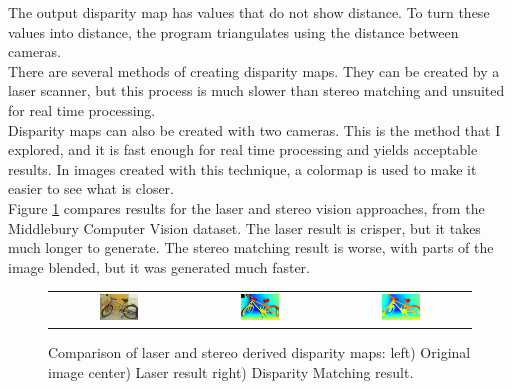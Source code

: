 \documentclass[11pt,fleqn]{article}
\begin{document}
The output disparity map has values that do not show distance. To turn these values into distance, the program triangulates using the distance between cameras.\\[5pt]
%
There are several methods of creating disparity maps. They can be created by a laser scanner, but this process is much slower than stereo matching and unsuited for real time processing. \\[5pt]
%
Disparity maps can also be created with two cameras. This is the method that I explored, and it is fast enough for real time processing and yields acceptable results. In images created with this technique, a colormap is used to make it easier to see what is closer.\\[5pt]
%
Figure \ref{fig:result1} compares results for the laser and stereo vision approaches, from the Middlebury Computer Vision dataset. The laser result is crisper, but it takes much longer to generate. The stereo matching result is worse, with parts of the image blended, but it was generated much faster. \\

\begin{figure}[!h]
\begin{mdframed}
\centering
\setlength{}
\begin{tabular}{ccc}
\includegraphics[width=0.3\textwidth]{images/_im0-600.jpg} &
\includegraphics[width=0.3\textwidth]{images/disp0GT-600.jpg} &
\includegraphics[width=0.3\textwidth]{images/_disp-600.jpg} \\[2pt]
\end{tabular}
\caption[Comparison of laser and stereo derived disparity maps]{Comparison of laser and stereo derived disparity maps: left) Original image center) Laser result right) Disparity Matching result.}
\label{fig:result1}
\end{mdframed}
\end{figure}
\end{document}
